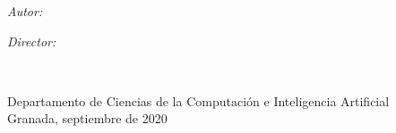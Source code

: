\documentclass[
11pt, %
spanish, %
singlespacing, %
headsepline, %
]{MastersDoctoralThesis} %
\begin{document}
\begin{titlepage}
\begin{center}
\begin{minipage}[t]{0.4\textwidth}
\begin{flushleft} \large
\emph{Autor:}\\
\href{https://github.com/rodrigo-orellana}{\authorname} %
\end{flushleft}
\end{minipage}
\begin{minipage}[t]{0.4\textwidth}
\begin{flushleft} \large
\emph{Director:} \\
\href{http://elvex.ugr.es/}{\supname} %
\end{flushleft}
\end{minipage}\\[2.5cm]
 
\vfill


\hspace{1cm}


Departamento de Ciencias de la Computación e Inteligencia Artificial
\\
Granada, septiembre de 2020\\[2cm] %
 
\vfill

 
\vfill
\end{center}
\end{titlepage}



\end{document}

